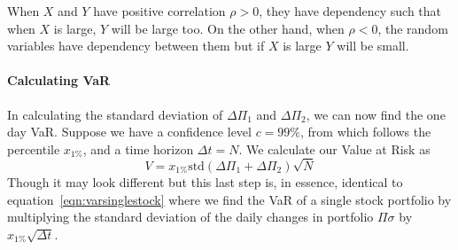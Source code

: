 \documentclass[../analytical_approach.tex]{subfiles}
\begin{document}
When $X$ and $Y$ have positive correlation $\rho > 0$, they have dependency such that when $X$ is large, $Y$ will be large too.
On the other hand, when $\rho < 0$, the random variables have dependency between them but if $X$ is large $Y$ will be small.

\paragraph{Calculating VaR\\}

In calculating the standard deviation of $\Delta\Pi_1$ and $\Delta\Pi_2$, we can now find the one day VaR.
Suppose we have a confidence level $c = 99\%$, from which follows the percentile $x_{1\%}$, and a time horizon $\Delta t = N$.
We calculate our Value at Risk as
\begin{equation}
    \label{eqn:jointvar}
    V= x_{1\%}\text{std}(\Delta\Pi_1+\Delta\Pi_2)\sqrt{N}
\end{equation}
Though it may look different but this last step is, in essence, identical to equation~\ref{eqn:varsinglestock} where we find the VaR of a single stock portfolio by multiplying the standard deviation of the daily changes in portfolio $\Pi\sigma$  by $x_{1\%}\sqrt{\Delta t}$.
\end{document}

